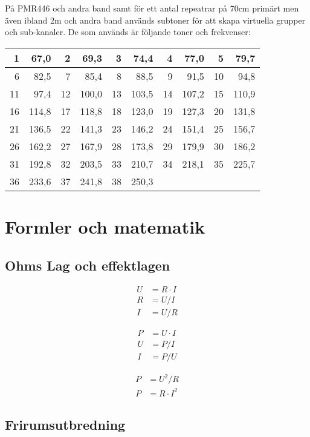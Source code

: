\documentclass[10pt,swedish,a4paper]{article}
\begin{document}
På PMR446 och andra band samt för ett antal repeatrar på 70cm primärt men även ibland 2m och andra band används subtoner för att skapa virtuella grupper och sub-kanaler. De som används är följande toner och frekvenser:

\begin{tabular}{rr|rr|rr|rr|rr}
	 1 &  67,0 &  2 &  69,3 &  3 &  74,4 &  4 &  77,0 &  5 &  79,7 \\ \hline
	 6 &  82,5 &  7 &  85,4 &  8 &  88,5 &  9 &  91,5 & 10 &  94,8 \\ \hline
	11 &  97,4 & 12 & 100,0 & 13 & 103,5 & 14 & 107,2 & 15 & 110,9 \\ \hline
	16 & 114,8 & 17 & 118,8 & 18 & 123,0 & 19 & 127,3 & 20 & 131,8 \\ \hline
	21 & 136,5 & 22 & 141,3 & 23 & 146,2 & 24 & 151,4 & 25 & 156,7 \\ \hline
	26 & 162,2 & 27 & 167,9 & 28 & 173,8 & 29 & 179,9 & 30 & 186,2 \\ \hline
	31 & 192,8 & 32 & 203,5 & 33 & 210,7 & 34 & 218,1 & 35 & 225,7 \\ \hline
	36 & 233,6 & 37 & 241,8 & 38 & 250,3 &    &       &    &
\end{tabular}



\section{Formler och matematik}

\subsection{Ohms Lag och effektlagen}

\begin{align}
U &= R\cdot I\\
R &= U/I\\
I &= U/R
\end{align}

\begin{align}
P &= U \cdot I\\
U &= P/I\\
I &= P/U
\end{align}

\begin{align}
P &= U^2/R\\
P &= R \cdot I^2
\end{align}

\subsection{Frirumsutbredning}
\end{document}
